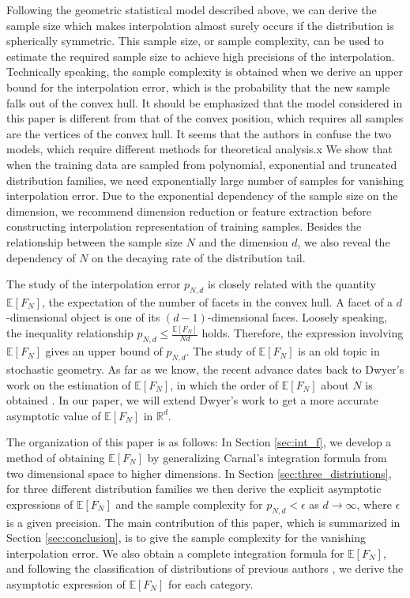 \documentclass[conference,a4paper]{IEEEtran}
\def\E{\mathbb{E}}
\def\R{\mathbb{R}}
\begin{document}
Following the geometric statistical model described above, we can derive the sample size which makes
interpolation almost surely occurs if the distribution is spherically symmetric.
This sample size, or sample complexity, can be used to estimate the required sample size
to achieve high precisions of the interpolation.
Technically speaking, the sample complexity is obtained when we derive an upper bound for the interpolation error,
which is the probability that the new sample falls out of the convex hull.
It should be emphasized that the model considered in this paper is different from that of the convex position,
which requires all samples are the vertices of the convex hull.
It seems that the authors in \cite{balestriero2021learning} confuse the two models, which require
different methods for theoretical analysis.x
We show that when the training data are sampled from polynomial,
exponential and truncated distribution families,
we need exponentially large number of samples for vanishing interpolation error.
Due to the exponential dependency of the sample size on the dimension, we recommend dimension reduction or feature extraction
before constructing interpolation representation of training samples.
Besides the relationship between the sample size $N$ and the dimension $d$,
we also reveal the dependency of $N$ on the decaying rate of the distribution tail.

The study of the interpolation error $p_{N,d}$ is closely related with the quantity $\E[F_N]$,
the expectation of the number of facets in the convex hull. A facet of a $d$-dimensional object is one of its $(d-1)$-dimensional faces.
Loosely speaking,
the inequality relationship $p_{N,d} \leq \frac{\E[F_N]}{Nd}$ holds. Therefore, the expression
involving $\E[F_N]$ gives an upper bound of $p_{N,d}$.
The study of $\E[F_N]$
is an old topic in stochastic geometry. As far as we know, the recent advance dates back to Dwyer's work on the estimation of $\E[F_N]$,
in which the order of $\E[F_N]$ about $N$ is obtained \cite{dwyer1991convex}. In our paper, we will extend Dwyer's work
to get a more accurate asymptotic value of $\E[F_N]$ in $\R^d$.

The organization of this paper is as follows: In Section \ref{sec:int_f}, we develop a method of obtaining $\E[F_N]$ by generalizing Carnal's integration formula
from two dimensional space to higher dimensions.
In Section \ref{sec:three_distriutions}, for three different distribution families we then derive the explicit asymptotic
expressions of $\E[F_N]$ and the sample complexity for $p_{N,d}<\epsilon$ as $d\to\infty$,
where $\epsilon$ is a given precision.
The main contribution of this paper,
which is summarized in Section \ref{sec:conclusion},
is to give the sample complexity for the vanishing interpolation error.
We also obtain a complete integration formula for $\E[F_N]$,
and following the classification of distributions of previous authors \cite{carnal1970konvexe,dwyer1991convex},
we derive the asymptotic expression
of $\E[F_N]$ for each category.
\end{document}
